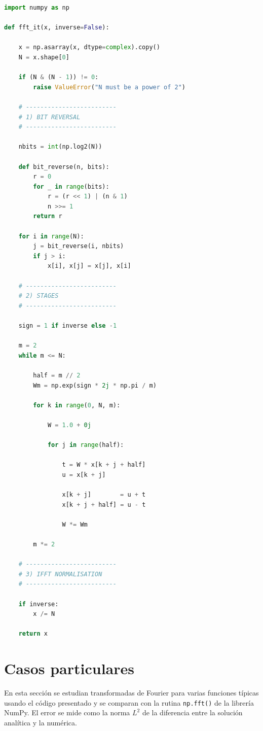 \documentclass[11pt,a4paper,twoside,pdf]{article}
\numberwithin{equation}{section}
\begin{document}
\begin{lstlisting}[language=Python, caption = Función que implementa la FFT con el método iterativo.]
import numpy as np

def fft_it(x, inverse=False):

    x = np.asarray(x, dtype=complex).copy()
    N = x.shape[0]

    if (N & (N - 1)) != 0:
        raise ValueError("N must be a power of 2")

    # -------------------------
    # 1) BIT REVERSAL
    # -------------------------

    nbits = int(np.log2(N))

    def bit_reverse(n, bits):
        r = 0
        for _ in range(bits):
            r = (r << 1) | (n & 1)
            n >>= 1
        return r

    for i in range(N):
        j = bit_reverse(i, nbits)
        if j > i:
            x[i], x[j] = x[j], x[i]

    # -------------------------
    # 2) STAGES
    # -------------------------

    sign = 1 if inverse else -1

    m = 2
    while m <= N:

        half = m // 2
        Wm = np.exp(sign * 2j * np.pi / m)

        for k in range(0, N, m):

            W = 1.0 + 0j

            for j in range(half):

                t = W * x[k + j + half]
                u = x[k + j]

                x[k + j]        = u + t
                x[k + j + half] = u - t

                W *= Wm

        m *= 2

    # -------------------------
    # 3) IFFT NORMALISATION
    # -------------------------

    if inverse:
        x /= N

    return x
\end{lstlisting}




\section{Casos particulares}


En esta sección se estudian transformadas de Fourier para varias funciones típicas usando el código presentado y se comparan con la rutina \texttt{np.fft()} de la librería NumPy. El error se mide como la norma $L^2$ de la diferencia entre la solución analítica y la numérica.
\end{document}
